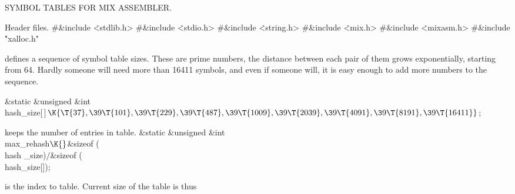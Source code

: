 
%
%
%


SYMBOL TABLES FOR MIX ASSEMBLER.

\Y\fi

Header files.
\Y\B\8\#\&{include} \.{<stdlib.h>}\6
\8\#\&{include} \.{<stdio.h>}\6
\8\#\&{include} \.{<string.h>}\6
\8\#\&{include} \.{<mix.h>}\6
\8\#\&{include} \.{<mixasm.h>}\6
\8\#\&{include} \.{"xalloc.h"}\par
\fi

 defines a sequence of symbol table sizes. These are
prime numbers,
the distance between each pair of them grows exponentially, starting from 64.
Hardly someone will need more than 16411 symbols, and even if someone will,
it is easy enough to add more numbers to the sequence.

\Y\B\&{static} \&{unsigned} \&{int} \\{hash\_size}[\,]${}\K\{\T{37},\39\T{101},%
\39\T{229},\39\T{487},\39\T{1009},\39\T{2039},\39\T{4091},\39\T{8191},\39%
\T{16411}\}{}$;\par
\fi

 keeps the number of entries in 
table.
\Y\B\&{static} \&{unsigned} \&{int} \\{max\_rehash}${}\K{}$\&{sizeof} (\\{hash%
\_size})${}/{}$\&{sizeof} (\\{hash\_size}[]);\par
\fi

 is the index to  table. Current size
of the
 table is thus 

